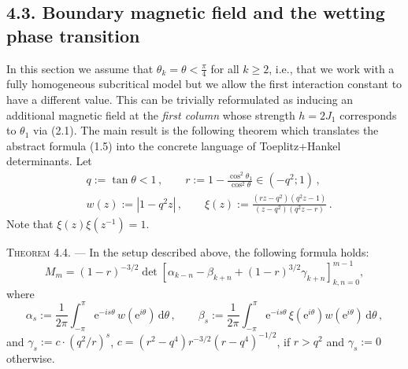 \documentclass[11pt]{article}
\theoremstyle{plain}
\begin{document}


\subsection*{4.3. Boundary magnetic field and the wetting phase transition}

In this section we assume that $\theta_k = \theta < \frac{\pi}{4}$ for all $k \geqslant 2$, i.e., that we
work with a fully homogeneous subcritical model but we allow the first interaction constant to have a
different value. This can be trivially reformulated as inducing an additional magnetic field at the
\emph{first column} whose strength $h = 2J_1$ corresponds to $\theta_1$ via (2.1). The main result is the
following theorem which translates the abstract formula (1.5) into the concrete language of
Toeplitz+Hankel determinants. Let
\begin{equation}
\tag{4.13}
\begin{aligned}
& q := \tan\theta < 1 \,, \qquad r := 1 - \frac{\cos^2\theta_1}{\cos^2\theta} \in (-q^2;1) \,, \\
& w(z) := |1 - q^2z| \,, \qquad \xi(z) := \frac{(rz-q^2)(q^2z-1)}{(z-q^2)(q^2z-r)} \,.
\end{aligned}
\end{equation}
Note that $\xi(z)\xi(z^{-1}) = 1$.


\medskip
\noindent\textsc{Theorem 4.4.} --- In the setup described above, the following formula holds:
\begin{equation}
\tag{4.14}
M_m = (1-r)^{-3/2}\det\left[\alpha_{k-n} - \beta_{k+n} + (1-r)^{3/2}\gamma_{k+n}\right]_{k,n=0}^{m-1},
\end{equation}
where
\[
\alpha_s := \frac{1}{2\pi}\int_{-\pi}^{\pi} \mathrm{e}^{-is\theta}\, w(\mathrm{e}^{i\theta})\, \mathrm{d}\theta \,, \qquad
\beta_s := \frac{1}{2\pi}\int_{-\pi}^{\pi} \mathrm{e}^{-is\theta}\, \xi(\mathrm{e}^{i\theta})w(\mathrm{e}^{i\theta})\, \mathrm{d}\theta \,,
\]
and $\gamma_s := c\cdot(q^2/r)^s$, $c = (r^2-q^4)r^{-3/2}(r-q^4)^{-1/2}$, if $r > q^2$ and $\gamma_s := 0$
otherwise.
\end{document}
